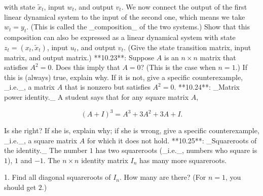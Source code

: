 with state \(\tilde{x}_{t}\), input \(w_{t}\), and output \(v_{t}\). We now connect the output of the first linear dynamical system to the input of the second one, which means we take \(w_{t}=y_{t}\). (This is called the _composition_ of the two systems.) Show that this composition can also be expressed as a linear dynamical system with state \(z_{t}=(x_{t},\tilde{x}_{t})\), input \(u_{t}\), and output \(v_{t}\). (Give the state transition matrix, input matrix, and output matrix.)
**10.23**: Suppose \(A\) is an \(n\times n\) matrix that satisfies \(A^{2}=0\). Does this imply that \(A=0\)? (This is the case when \(n=1\).) If this is (always) true, explain why. If it is not, give a specific counterexample, _i.e._, a matrix \(A\) that is nonzero but satisfies \(A^{2}=0\).
**10.24**: _Matrix power identity._ A student says that for any square matrix \(A\),

\[(A+I)^{3}=A^{3}+3A^{2}+3A+I.\]

Is she right? If she is, explain why; if she is wrong, give a specific counterexample, _i.e._, a square matrix \(A\) for which it does not hold.
**10.25**: _Squareroots of the identity._ The number \(1\) has two squareroots (_i.e._, numbers who square is \(1\)), \(1\) and \(-1\). The \(n\times n\) identity matrix \(I_{n}\) has many more squareroots.

1. Find all diagonal squareroots of \(I_{n}\). How many are there? (For \(n=1\), you should get \(2\).)